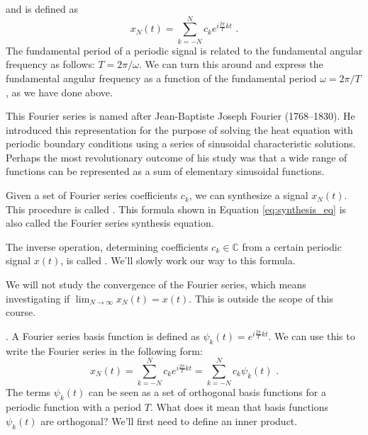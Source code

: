  and is defined as
\begin{equation}
  \boxed{
    x_N(t) = \sum_{k=-N}^{N} c_k e^{i \frac{2\pi}{T} k t}
    \label{eq:synthesis_eq}
  } \,\,.
\end{equation}
The fundamental period of a periodic signal is related to the fundamental angular frequency
as follows: $T=2\pi/\omega$.
We can turn this around and express the fundamental angular frequency as a function of
the fundamental period $\omega=2\pi/T$, as we have done above.


This Fourier series is named after Jean-Baptiste Joseph Fourier (1768–1830).
He introduced this representation for the purpose of solving the heat equation with
periodic boundary conditions using a series of sinusoidal characteristic solutions.
Perhaps the most revolutionary outcome of his study was that a wide range of functions
can be represented as a sum of elementary sinusoidal functions.

Given a set of Fourier series coefficients $c_k$, we can synthesize a signal $x_N(t)$.
This procedure is called \emph{}.
This formula shown in Equation \ref{eq:synthesis_eq} is also called the Fourier series synthesis equation.

The inverse operation, determining coefficients $c_k \in \mathbb{C}$ from a certain
periodic signal $x(t)$, is called \emph{}.
We'll slowly work our way to this formula.

We will not study the convergence of the Fourier series, which means investigating
if $\lim_{N\rightarrow \infty} x_N(t) = x(t)$. This is outside the scope of this course.

. A Fourier series basis function is defined
as $\psi_k(t)=e^{i\frac{2\pi}{T} k t}$.
We can use this to write the Fourier series in the following form:
\begin{equation}
  x_N(t) = \sum_{k=-N}^{N} c_k e^{i \frac{2\pi}{T} k t} = \sum_{k=-N}^{N} c_k \psi_k(t) \,\,.
\end{equation}
The terms $\psi_k(t)$ can be seen as a set of orthogonal basis functions for a periodic
function with a period $T$. What does it mean that basis functions $\psi_k(t)$ are orthogonal?
We'll first need to define an inner product.




